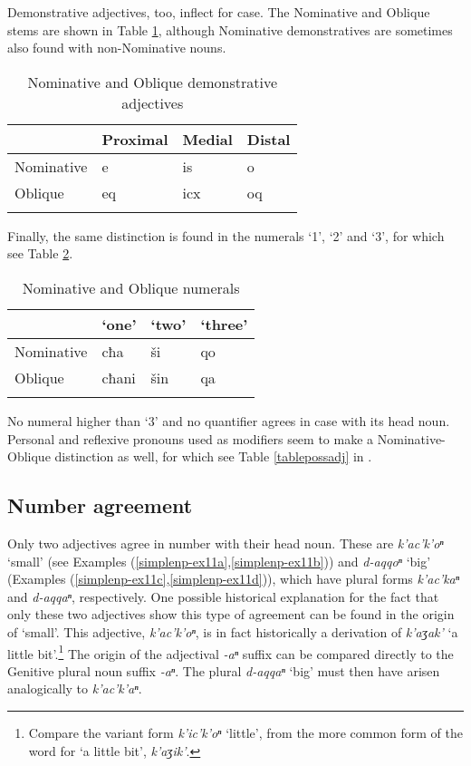 Demonstrative adjectives, too, inflect for case. The Nominative and Oblique stems are shown in Table \ref{Obliquedem}, although Nominative demonstratives are sometimes also found with non-Nominative nouns.

\begin{table}
	\begin{tabular}{llll}
    \lsptoprule
		& {Proximal} & {Medial} & {Distal} \\ 
		\midrule
		Nominative & e & is & o \\
		Oblique & eq & icx & oq \\
		\lspbottomrule
	\end{tabular}
	\caption{Nominative and Oblique demonstrative adjectives}
	\label{Obliquedem}
\end{table}

Finally, the same distinction is found in the numerals `1', `2' and `3', for which see Table \ref{Obliquenum}.

\begin{table}
	\begin{tabular}{llll}
    \lsptoprule
		& `one' & `two' & `three' \\ 
		\midrule
		Nominative & cħa & ši & qo \\
		Oblique & cħani & šin & qa \\
        \lspbottomrule
	\end{tabular}
	\caption{Nominative and Oblique numerals}
	\label{Obliquenum}
\end{table}




No numeral higher than `3' and no quantifier agrees in case with its head noun. Personal and reflexive pronouns used as modifiers seem to make a Nominative-Oblique distinction as well, for which see Table \ref{tablepossadj} in .

\subsection{Number agreement}

Only two adjectives agree in number with their head noun. These are \textit{k'ac'k'oⁿ} `small' (see Examples (\ref{simplenp-ex11a},\ref{simplenp-ex11b})) and \textit{d-aqqoⁿ} `big' (Examples (\ref{simplenp-ex11c},\ref{simplenp-ex11d})), which have plural forms \textit{k'ac'kaⁿ} and \textit{d-aqqaⁿ}, respectively. One possible historical explanation for the fact that only these two adjectives show this type of agreement can be found in the origin of `small'. This adjective, \textit{k'ac'k'oⁿ}, is in fact historically a derivation of \textit{k'aʒak'} `a little bit'.\footnote{Compare the variant form \textit{k'ic'k'oⁿ} `little', from the more common form of the word for `a little bit', \textit{k'aʒik'}.} The origin of the adjectival \textit{-aⁿ} suffix can be compared directly to the Genitive plural noun suffix \textit{-aⁿ}. The plural \textit{d-aqqaⁿ} `big' must then have arisen analogically to \textit{k'ac'k'aⁿ}.

